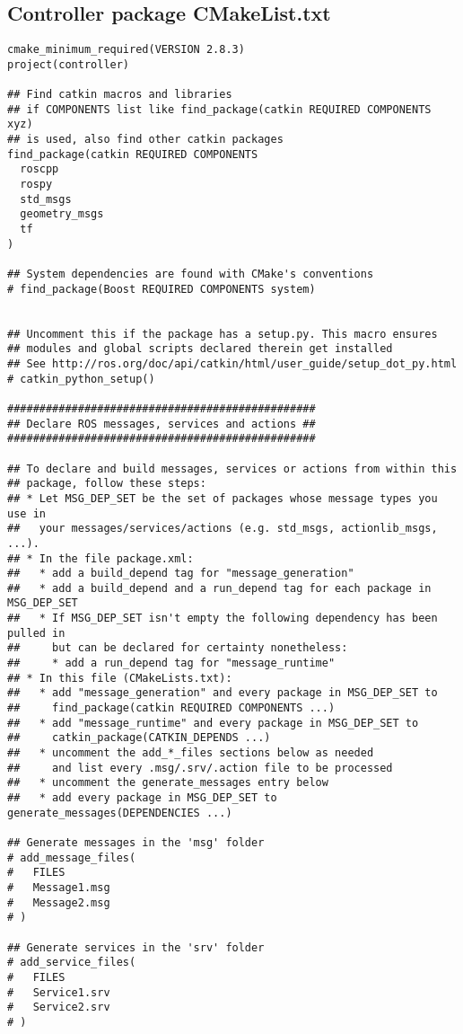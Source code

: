 \subsection{Controller package CMakeList.txt}
\begin{lstlisting}
cmake_minimum_required(VERSION 2.8.3)
project(controller)

## Find catkin macros and libraries
## if COMPONENTS list like find_package(catkin REQUIRED COMPONENTS xyz)
## is used, also find other catkin packages
find_package(catkin REQUIRED COMPONENTS
  roscpp
  rospy
  std_msgs
  geometry_msgs
  tf
)

## System dependencies are found with CMake's conventions
# find_package(Boost REQUIRED COMPONENTS system)


## Uncomment this if the package has a setup.py. This macro ensures
## modules and global scripts declared therein get installed
## See http://ros.org/doc/api/catkin/html/user_guide/setup_dot_py.html
# catkin_python_setup()

################################################
## Declare ROS messages, services and actions ##
################################################

## To declare and build messages, services or actions from within this
## package, follow these steps:
## * Let MSG_DEP_SET be the set of packages whose message types you use in
##   your messages/services/actions (e.g. std_msgs, actionlib_msgs, ...).
## * In the file package.xml:
##   * add a build_depend tag for "message_generation"
##   * add a build_depend and a run_depend tag for each package in MSG_DEP_SET
##   * If MSG_DEP_SET isn't empty the following dependency has been pulled in
##     but can be declared for certainty nonetheless:
##     * add a run_depend tag for "message_runtime"
## * In this file (CMakeLists.txt):
##   * add "message_generation" and every package in MSG_DEP_SET to
##     find_package(catkin REQUIRED COMPONENTS ...)
##   * add "message_runtime" and every package in MSG_DEP_SET to
##     catkin_package(CATKIN_DEPENDS ...)
##   * uncomment the add_*_files sections below as needed
##     and list every .msg/.srv/.action file to be processed
##   * uncomment the generate_messages entry below
##   * add every package in MSG_DEP_SET to generate_messages(DEPENDENCIES ...)

## Generate messages in the 'msg' folder
# add_message_files(
#   FILES
#   Message1.msg
#   Message2.msg
# )

## Generate services in the 'srv' folder
# add_service_files(
#   FILES
#   Service1.srv
#   Service2.srv
# )


\end{lstlisting}
